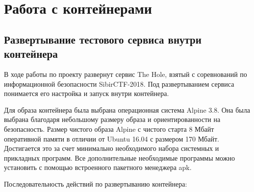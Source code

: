 \section{Работа с контейнерами}

\subsection{Развертывание тестового сервиса внутри контейнера}

В ходе работы по проекту развернут сервис The Hole, взятый с соревнований по информационной безопасности SibirCTF-2018. Под развертыванием сервиса понимается его настройка и запуск внутри контейнера.\par
Для образа контейнера была выбрана операционная система Alpine 3.8. Она была выбрана благодаря небольшому размеру образа и ориентированности на безопасность. Размер чистого образа Alpine с чистого старта 8 Мбайт оперативной памяти в отличии от Ubuntu 16.04 с размером 170 Мбайт. Достигается это за счет минимально необходимого набора системных и прикладных программ. Все дополнительные необходимые программы можно установить с помощью встроенного пакетного менеджера apk.\par
Последовательность действий по развертыванию контейнера:
